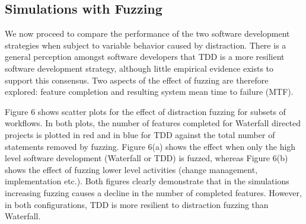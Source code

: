 \documentclass{llncs}
\begin{document}
\subsection{Simulations with Fuzzing}

We now proceed to compare the performance of the two software development strategies when subject to variable behavior
caused by distraction.  There is a general perception amongst software developers that TDD is a more resilient software
development strategy, although little empirical evidence exists to support this consensus.  Two aspects of the effect of
fuzzing are therefore explored: feature completion and resulting system mean time to failure (MTF).

Figure 6 shows scatter plots for the effect of distraction fuzzing for subsets of workflows.  In both plots, the number
of features completed for Waterfall directed projects is plotted in red and in blue for TDD against the total number of
statements removed by fuzzing.  Figure 6(a) shows the effect when only the high level software development (Waterfall or
TDD) is fuzzed, whereas Figure 6(b) shows the effect of fuzzing lower level activities (change management,
implementation etc.).  Both figures clearly demonstrate that in the simulations increasing fuzzing causes a decline in
the number of completed features.  However, in both configurations, TDD is more resilient to distraction fuzzing than
Waterfall.
\end{document}
